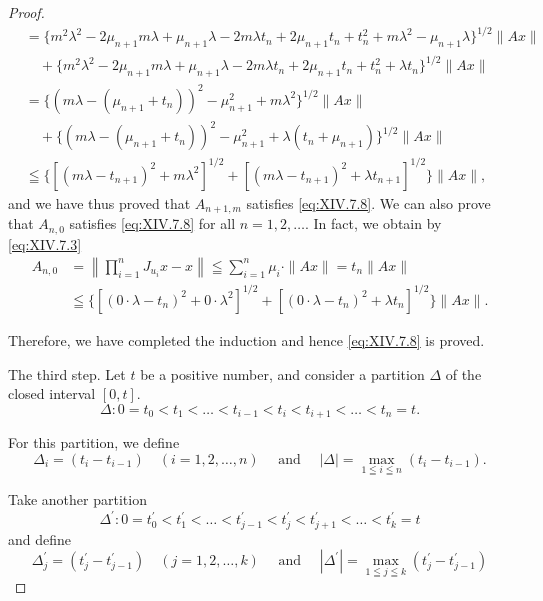 \begin{proof}
\[\begin{aligned}
&=\bigl\{m^2\lambda^2-2\mu_{n+1}m\lambda+\mu_{n+1}\lambda
  -2m\lambda t_n+2\mu_{n+1}t_n+t_n^2+m\lambda^2-\mu_{n+1}\lambda\bigr\}^{1/2}\|Ax\|\\
&\quad+\bigl\{m^2\lambda^2-2\mu_{n+1}m\lambda+\mu_{n+1}\lambda
  -2m\lambda t_n+2\mu_{n+1}t_n+t_n^2+\lambda t_n\bigr\}^{1/2}\|Ax\|\\
&=\bigl\{(m\lambda-(\mu_{n+1}+t_n))^2-\mu_{n+1}^2+m\lambda^2\bigr\}^{1/2}\|Ax\|\\
&\quad+\bigl\{(m\lambda-(\mu_{n+1}+t_n))^2-\mu_{n+1}^2
  +\lambda(t_n+\mu_{n+1})\bigr\}^{1/2}\|Ax\|\\
&\leqq\bigl\{[(m\lambda-t_{n+1})^2+m\lambda^2]^{1/2}
  +[(m\lambda-t_{n+1})^2+\lambda t_{n+1}]^{1/2}\bigr\}\|Ax\|,
\end{aligned}
\]
and we have thus proved that $A_{n+1,m}$ satisfies \eqref{eq:XIV.7.8}. We can also prove that $A_{n,0}$ satisfies \eqref{eq:XIV.7.8} for all $n = 1, 2, \ldots$. In fact, we obtain by \eqref{eq:XIV.7.3} 
\[
\begin{aligned}
A _{n,0}& = \left\| \prod\limits_{i=1} ^{n} J _ {u _{i}} x - x \right\| \leqq \sum\limits_{i=1} ^{n} \mu_{i} \cdot \| A x \| = t _{n} \| A x \|
\\
\quad& \leqq \{[ (0 \cdot \lambda - t _{n}) ^{2} + 0 \cdot \lambda^{2} ] ^{1/2} + [ (0 \cdot \lambda - t _{n}) ^{2} + \lambda t _{n} ] ^{1/2} \} \| A x \|.
\end{aligned}
\]

Therefore, we have completed the induction and hence \eqref{eq:XIV.7.8} is proved. 

The third step. Let $t$ be a positive number, and consider a partition $\Delta$ of the closed interval $[0, t]$. 
\[
\Delta : 0 = t _{0} < t _{1} < \dots < t _{i-1} < t _{i} < t _{i+1} < \dots < t _{n} = t.
\]

For this partition, we define 
\[
\Delta_{i} = \left(t _{i} - t _{i-1}\right) \quad (i = 1, 2, \dots , n) \quad \text{ and } \quad | \Delta | = \max\limits _{1 \leqq i \leqq n} \left(t _{i} - t _{i-1}\right).
\]

Take another partition 
\[
\Delta^{\prime}: 0 = t _{0} ^{\prime} < t _{1} ^{\prime} < \dots < t _{j-1} ^{\prime} < t _{j} ^{\prime} < t _{j+1} ^{\prime} < \dots < t _{k} ^{\prime} = t
\]
and define 
\[
\Delta_{j} ^{\prime} = \left(t _{j} ^{\prime} - t _{j-1} ^{\prime}\right) \quad (j = 1, 2, \dots , k) \quad \text{ and } \quad | \Delta^{\prime} | = \max\limits _{1 \leqq j \leqq k} \left(t _{j} ^{\prime} - t _{j-1} ^{\prime}\right)
\]


\end{proof}
